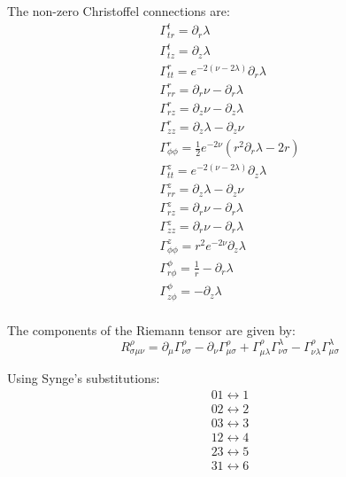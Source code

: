 \documentclass{article}
\begin{document}
The non-zero Christoffel connections are:
\begin{equation}
\begin{array}{l}
\Gamma_{tr}^{t}=\partial_{r}\lambda\\
\Gamma_{tz}^{t}=\partial_{z}\lambda\\
\Gamma_{tt}^{r}=e^{-2\left(\nu-2\lambda\right)}\partial_{r}\lambda\\
\Gamma_{rr}^{r}=\partial_{r}\nu-\partial_{r}\lambda\\
\Gamma_{rz}^{r}=\partial_{z}\nu-\partial_{z}\lambda\\
\Gamma_{zz}^{r}=\partial_{z}\lambda-\partial_{z}\nu\\
\Gamma_{\phi\phi}^{r}=\frac{1}{2}e^{-2\nu}\left(r^{2}\partial_{r}\lambda-2r\right)\\
\Gamma_{tt}^{z}=e^{-2\left(\nu-2\lambda\right)}\partial_{z}\lambda\\
\Gamma_{rr}^{z}=\partial_{z}\lambda-\partial_{z}\nu\\
\Gamma_{rz}^{z}=\partial_{r}\nu-\partial_{r}\lambda\\ 
\Gamma_{zz}^{z}=\partial_{r}\nu-\partial_{r}\lambda\\
\Gamma_{\phi\phi}^{z}=r^{2}e^{-2\nu}\partial_{z}\lambda\\
\Gamma_{r\phi}^{\phi}=\frac{1}{r}-\partial_{r}\lambda\\
\Gamma_{z\phi}^{\phi}=-\partial_{z}\lambda\\
\end{array}
\end{equation}

The components of the Riemann tensor are given by:
\begin{equation}
R_{\sigma\mu\nu}^{\rho}=\partial_{\mu}\Gamma_{\nu\sigma}^{\rho}-\partial_{\nu}\Gamma_{\mu\sigma}^{\rho}+\Gamma_{\mu\lambda}^{\rho}\Gamma_{\nu\sigma}^{\lambda}-\Gamma_{\nu\lambda}^{\rho}\Gamma_{\mu\sigma}^{\lambda}
\end{equation}

Using Synge's substitutions:
\begin{equation}
\begin{array}{c}
01\longleftrightarrow1\\
02\longleftrightarrow2\\
03\longleftrightarrow3\\
12\longleftrightarrow4\\
23\longleftrightarrow5\\
31\longleftrightarrow6\\
\end{array}
\end{equation}
\end{document}
